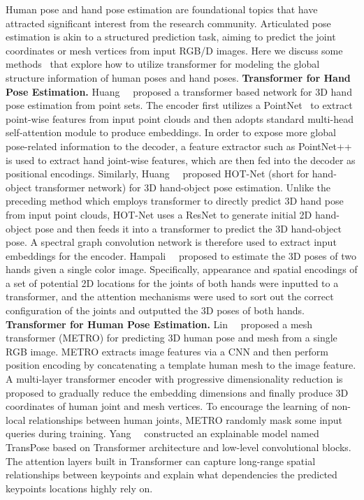 Human pose and hand pose estimation are foundational topics that have attracted significant interest from the research community. Articulated pose estimation is akin to a structured prediction task, aiming to predict the joint coordinates or mesh vertices from input RGB/D images. Here we discuss some methods~ that explore how to utilize transformer for modeling the global structure information of human poses and hand poses.
\noindent\textbf{Transformer for Hand Pose Estimation.}
Huang~\etal~ proposed a transformer based network for 3D hand pose estimation from point sets. The encoder first utilizes a PointNet~ to extract point-wise features from input point clouds and then adopts standard multi-head self-attention module to produce embeddings. In order to expose more global pose-related information to the decoder, a feature extractor such as PointNet++~ is used to extract hand joint-wise features, which are then fed into the decoder as positional encodings.
Similarly, Huang~\etal~ proposed HOT-Net (short for hand-object transformer network) for 3D hand-object pose estimation. Unlike the preceding method which employs transformer to directly predict 3D hand pose from input point clouds, HOT-Net uses a ResNet to generate initial 2D hand-object pose and then feeds it into a transformer to predict the 3D hand-object pose. A spectral graph convolution network is therefore used to extract input embeddings for the encoder.
Hampali~\etal~ proposed to estimate the 3D poses of two hands given a single color image. Specifically, appearance and spatial encodings of a set of potential 2D locations for the joints of both hands were inputted to a transformer, and the attention mechanisms were used to sort out the correct configuration of the joints and outputted the 3D poses of both hands.
\noindent\textbf{Transformer for Human Pose Estimation.}
Lin~\etal~ proposed a mesh transformer (METRO) for predicting 3D human pose and mesh from a single RGB image. METRO extracts image features via a CNN and then perform position encoding by concatenating a template human mesh to the image feature. A multi-layer transformer encoder with progressive dimensionality reduction is proposed to gradually reduce the embedding dimensions and finally produce 3D coordinates of human joint and mesh vertices. To encourage the learning of non-local relationships between human joints, METRO randomly mask some input queries during training.
Yang~\etal~ constructed an explainable model named TransPose based on Transformer architecture and low-level convolutional blocks. The attention layers built in Transformer can capture long-range spatial relationships between keypoints and explain what dependencies the predicted keypoints locations highly rely on.
